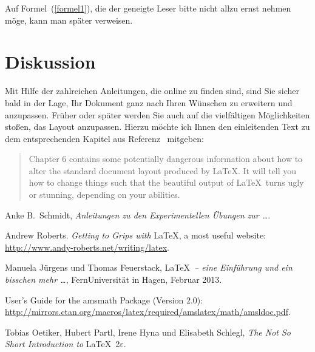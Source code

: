 \documentclass[
	fontsize=11pt,
	paper=a4,
	pagesize=auto,
	parskip=false,
	titlepage=on,
	ngerman
]{scrartcl}
\begin{document}
Auf Formel~(\ref{formel1}), die der geneigte Leser bitte nicht allzu ernst nehmen möge, kann man später verweisen.

\section{Diskussion}

Mit Hilfe der zahlreichen Anleitungen, die online zu finden sind, sind Sie sicher bald in der Lage, Ihr Dokument ganz nach Ihren Wünschen zu erweitern und anzupassen. Früher oder später werden Sie auch auf die vielfältigen Möglichkeiten stoßen, das Layout anzupassen. Hierzu möchte ich Ihnen den einleitenden Text zu dem entsprechenden Kapitel aus Referenz~\cite{lshort} mitgeben:

\begin{quote}
	Chapter 6 contains some potentially dangerous information about how to alter the standard document layout produced by \LaTeX. It will tell you how to change things such that the beautiful output of \LaTeX\ turns ugly or stunning, depending on your abilities.
\end{quote}


\begin{thebibliography}{9} %

Anke B.~Schmidt, \emph{Anleitungen zu den Experimentellen Übungen zur \ldots}.

Andrew Roberts. \emph{Getting to Grips with} \LaTeX, a most useful website: \url{http://www.andy-roberts.net/writing/latex}.

Manuela Jürgens und Thomas Feuerstack, \LaTeX\ \emph{-- eine Einführung und ein bisschen mehr \ldots}, FernUniversität in Hagen, Februar 2013.

User’s Guide for the amsmath Package (Version 2.0): \url{http://mirrors.ctan.org/macros/latex/required/amslatex/math/amsldoc.pdf}.

Tobias Oetiker, Hubert Partl, Irene Hyna und Elisabeth Schlegl, \emph{The Not So Short Introduction to} \LaTeX\ 2$\varepsilon$.

\end{thebibliography}
\end{document}
